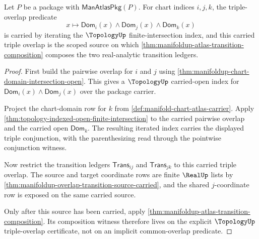 \begin{theorem}
\label{thm:manifoldup-triple-overlap-open-composition-scope}
Let $P$ be a package with $\mathsf{ManAtlasPkg}(P)$. For chart indices $i,j,k$,
the triple-overlap predicate
$$
x\longmapsto
\mathsf{Dom}_i(x)\wedge\mathsf{Dom}_j(x)\wedge\mathsf{Dom}_k(x)
$$
is carried by iterating the $\TopologyUp$ finite-intersection index, and this
carried triple overlap is the scoped source on which
\autoref{thm:manifoldup-atlas-transition-composition} composes the two
real-analytic transition ledgers.
\end{theorem}
\begin{proof}
First build the pairwise overlap for $i$ and $j$ using
\autoref{thm:manifoldup-chart-domain-intersection-open}. This gives a
$\TopologyUp$ carried-open index for
$\mathsf{Dom}_i(x)\wedge\mathsf{Dom}_j(x)$ over the package carrier.

Project the chart-domain row for $k$ from
\autoref{def:manifold-chart-atlas-carrier}. Apply
\autoref{thm:topology-indexed-open-finite-intersection} to the carried
pairwise overlap and the carried open $\mathsf{Dom}_k$. The resulting iterated
index carries the displayed triple conjunction, with the parenthesizing read
through the pointwise conjunction witness.

Now restrict the transition ledgers $\mathsf{Trans}_{ij}$ and
$\mathsf{Trans}_{jk}$ to this carried triple overlap. The source and target
coordinate rows are finite $\RealUp$ lists by
\autoref{thm:manifoldup-overlap-transition-source-carried}, and the shared
$j$-coordinate row is exposed on the same carried source.

Only after this source has been carried, apply
\autoref{thm:manifoldup-atlas-transition-composition}. Its composition witness
therefore lives on the explicit $\TopologyUp$ triple-overlap certificate, not
on an implicit common-overlap predicate.
\end{proof}

